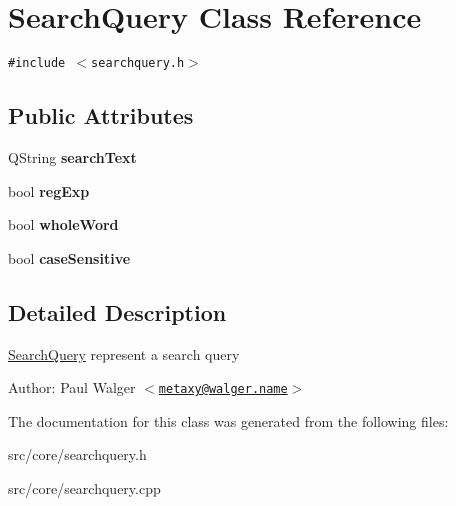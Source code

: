 \hypertarget{classSearchQuery}{
\section{SearchQuery Class Reference}
\label{classSearchQuery}
}
{\tt \#include $<$searchquery.h$>$}

\subsection*{Public Attributes}
\begin{CompactItemize}
\item 
\hypertarget{classSearchQuery_c1a81a6b032b5f72718324343174ae04}{
QString \textbf{searchText}}
\label{classSearchQuery_c1a81a6b032b5f72718324343174ae04}

\item 
\hypertarget{classSearchQuery_635a08b8d0451a89a4340b14b0d3e832}{
bool \textbf{regExp}}
\label{classSearchQuery_635a08b8d0451a89a4340b14b0d3e832}

\item 
\hypertarget{classSearchQuery_0fa67e4d661aab663f5123ea61a045c7}{
bool \textbf{wholeWord}}
\label{classSearchQuery_0fa67e4d661aab663f5123ea61a045c7}

\item 
\hypertarget{classSearchQuery_2b744cf7f53cf61650156d4df675ccbe}{
bool \textbf{caseSensitive}}
\label{classSearchQuery_2b744cf7f53cf61650156d4df675ccbe}

\end{CompactItemize}


\subsection{Detailed Description}
\hyperlink{classSearchQuery}{SearchQuery} represent a search query

\begin{Desc}
\item[Author:]Paul Walger $<$\href{mailto:metaxy@walger.name}{\tt metaxy@walger.name}$>$ \end{Desc}


The documentation for this class was generated from the following files:\begin{CompactItemize}
\item 
src/core/searchquery.h\item 
src/core/searchquery.cpp\end{CompactItemize}
